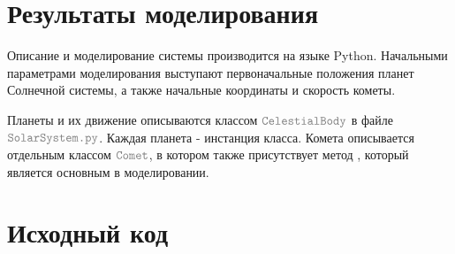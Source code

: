 \section{Результаты моделирования}
Описание и моделирование системы производится на языке Python.
Начальными параметрами моделирования выступают первоначальные положения планет Солнечной системы,
а также начальные координаты и скорость кометы.

Планеты и их движение описываются классом $\codeword{CelestialBody}$ в файле $\codeword{SolarSystem.py}$.
Каждая планета - инстанция класса. Комета описывается отдельным классом $\codeword{Comet}$, в котором также 
присутствует метод , который является основным в моделировании.

\newpage
\section{Исходный код}




